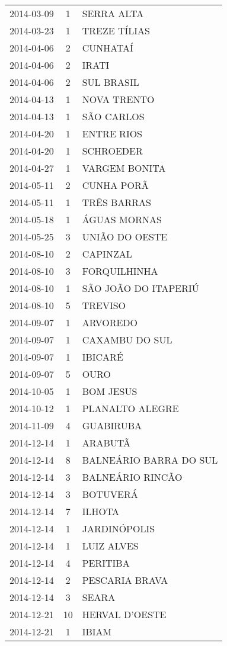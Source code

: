 \begin{longtable}[htbp]{ccl}
2014-03-09 & 1 & SERRA ALTA \\
2014-03-23 & 1 & TREZE TÍLIAS \\
2014-04-06 & 2 & CUNHATAÍ \\
2014-04-06 & 2 & IRATI \\
2014-04-06 & 2 & SUL BRASIL \\
2014-04-13 & 1 & NOVA TRENTO \\
2014-04-13 & 1 & SÃO CARLOS \\
2014-04-20 & 1 & ENTRE RIOS \\
2014-04-20 & 1 & SCHROEDER \\
2014-04-27 & 1 & VARGEM BONITA \\
2014-05-11 & 2 & CUNHA PORÃ \\
2014-05-11 & 1 & TRÊS BARRAS \\
2014-05-18 & 1 & ÁGUAS MORNAS \\
2014-05-25 & 3 & UNIÃO DO OESTE \\
2014-08-10 & 2 & CAPINZAL \\
2014-08-10 & 3 & FORQUILHINHA \\
2014-08-10 & 1 & SÃO JOÃO DO ITAPERIÚ \\
2014-08-10 & 5 & TREVISO \\
2014-09-07 & 1 & ARVOREDO \\
2014-09-07 & 1 & CAXAMBU DO SUL \\
2014-09-07 & 1 & IBICARÉ \\
2014-09-07 & 5 & OURO \\
2014-10-05 & 1 & BOM JESUS \\
2014-10-12 & 1 & PLANALTO ALEGRE \\
2014-11-09 & 4 & GUABIRUBA \\
2014-12-14 & 1 & ARABUTÃ \\
2014-12-14 & 8 & BALNEÁRIO BARRA DO SUL \\
2014-12-14 & 3 & BALNEÁRIO RINCÃO \\
2014-12-14 & 3 & BOTUVERÁ \\
2014-12-14 & 7 & ILHOTA \\
2014-12-14 & 1 & JARDINÓPOLIS \\
2014-12-14 & 1 & LUIZ ALVES \\
2014-12-14 & 4 & PERITIBA \\
2014-12-14 & 2 & PESCARIA BRAVA \\
2014-12-14 & 3 & SEARA \\
2014-12-21 & 10 & HERVAL D'OESTE \\
2014-12-21 & 1 & IBIAM \\

\end{longtable}

